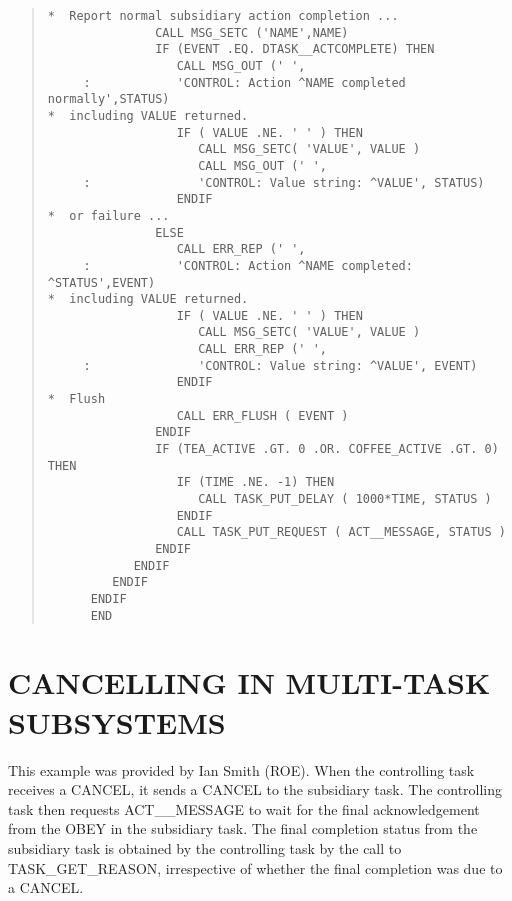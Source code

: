 \begin{quote}
\begin{verbatim}
*  Report normal subsidiary action completion ...
               CALL MSG_SETC ('NAME',NAME)
               IF (EVENT .EQ. DTASK__ACTCOMPLETE) THEN
                  CALL MSG_OUT (' ',
     :            'CONTROL: Action ^NAME completed normally',STATUS)
*  including VALUE returned.
                  IF ( VALUE .NE. ' ' ) THEN
                     CALL MSG_SETC( 'VALUE', VALUE )
                     CALL MSG_OUT (' ',
     :               'CONTROL: Value string: ^VALUE', STATUS)
                  ENDIF                  
*  or failure ...
               ELSE
                  CALL ERR_REP (' ',
     :            'CONTROL: Action ^NAME completed: ^STATUS',EVENT)
*  including VALUE returned.
                  IF ( VALUE .NE. ' ' ) THEN
                     CALL MSG_SETC( 'VALUE', VALUE )
                     CALL ERR_REP (' ',
     :               'CONTROL: Value string: ^VALUE', EVENT)
                  ENDIF                  
*  Flush 
                  CALL ERR_FLUSH ( EVENT )
               ENDIF
               IF (TEA_ACTIVE .GT. 0 .OR. COFFEE_ACTIVE .GT. 0) THEN
                  IF (TIME .NE. -1) THEN
                     CALL TASK_PUT_DELAY ( 1000*TIME, STATUS )
                  ENDIF
                  CALL TASK_PUT_REQUEST ( ACT__MESSAGE, STATUS )
               ENDIF
            ENDIF
         ENDIF
      ENDIF
      END

\end{verbatim} \end{quote} \normalsize

\newpage
\section{CANCELLING IN MULTI-TASK SUBSYSTEMS}
\label{cmotask}
This example was provided by Ian Smith (ROE). When the controlling task 
receives a CANCEL, it sends a CANCEL to the subsidiary task. The 
controlling task then requests ACT\_\_MESSAGE to wait for the 
final acknowledgement from the OBEY in the subsidiary task. The final 
completion status from the subsidiary task is obtained by the 
controlling task by the call to TASK\_GET\_REASON, irrespective of 
whether the final completion was due to a CANCEL.


